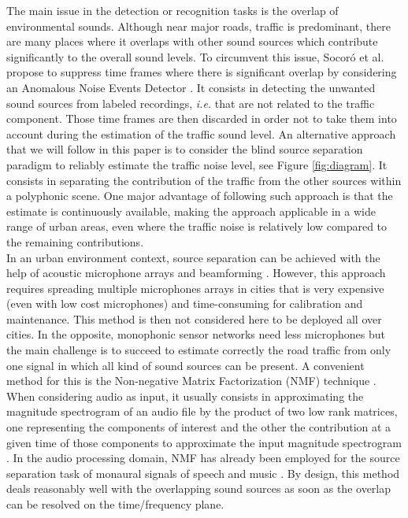 \documentclass[twocolumn]{svjour3}          %
\begin{document}
The main issue in the detection or recognition tasks is the overlap of environmental sounds. Although near major roads, traffic is predominant, there are many places where it overlaps with other sound sources which contribute significantly to the overall sound levels. To circumvent this issue, Socor\'o et al. propose to suppress time frames where there is significant overlap by considering an Anomalous Noise Events Detector \cite{socoro_anomalous_2017}. It consists in detecting the unwanted sound sources from labeled recordings, \textit{i.e.} that are not related to the traffic component. Those time frames are then discarded in order not to take them into account during the estimation of the traffic sound level.
An alternative approach that we will follow in this paper is to consider the blind source separation paradigm to reliably estimate the traffic noise level, see Figure \ref{fig:diagram}. It consists in separating the contribution of the traffic from the other sources within a polyphonic scene. One major advantage of following such approach is that the estimate is continuously available, making the approach applicable in a wide range of urban areas, even where the traffic noise is relatively low compared to the remaining contributions.\\

In an urban environment context, source separation can be achieved with the help of acoustic microphone arrays and beamforming \cite{saruwatari2003blind}. However, this approach requires spreading multiple microphones arrays in cities that is very expensive (even with low cost microphones) and time-consuming for calibration and maintenance. This method is then not considered here to be deployed all over cities. In the opposite, monophonic sensor networks need less microphones but the main challenge is to succeed to estimate correctly the road traffic from only one signal in which all kind of sound sources can be present. A convenient method for this is the  Non-negative Matrix Factorization (NMF) technique \cite{lee_learning_1999}. When considering audio as input, it usually consists in approximating the magnitude spectrogram of an audio file by the product of two low rank matrices, one representing the components of interest and the other the contribution at a given time of those components to approximate the input magnitude spectrogram \cite{smaragdis_non-negative_2003} \cite{wilson_speech_2008} \cite{mesaros_sound_2015}. In the audio processing domain, NMF has already been employed for the source separation task of monaural signals of speech and music \cite{wang_musical_2005} \cite{wilson_speech_2008}. By design, this method deals reasonably well with the overlapping sound sources as soon as the overlap can be resolved on the time/frequency plane.
\end{document}

